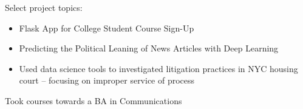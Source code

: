 \documentclass[8pt,letter,ragged2e]{altacv}
\begin{document}
Select project topics:
\begin{itemize}
    \item Flask App for College Student Course Sign-Up
    \item Predicting the Political Leaning of News Articles with Deep Learning
    \item Used data science tools to investigated litigation practices in NYC housing court – focusing on improper service of process
\end{itemize}

Took courses towards a BA in Communications

\clearpage
\end{document}
